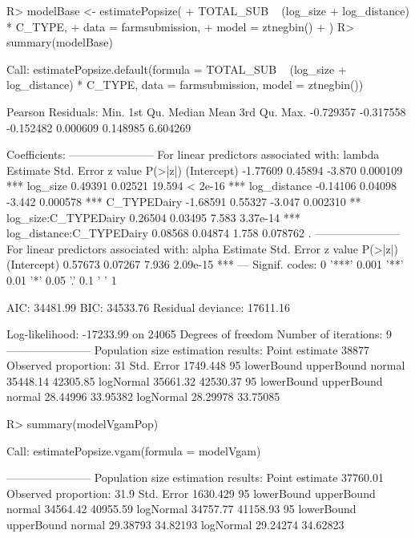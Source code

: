\documentclass[nojss]{jss}
\newcommand{\1}{\mathcal{I}} \newcommand{\bZero}{\boldsymbol{0}}
\begin{document}
\begin{CodeChunk}
\begin{CodeInput}
R> modelBase <- estimatePopsize(
+   TOTAL_SUB ~ (log_size + log_distance) * C_TYPE,
+   data = farmsubmission,
+   model = ztnegbin()
+ )
R> summary(modelBase)
\end{CodeInput}
\begin{CodeOutput}

Call:
estimatePopsize.default(formula = TOTAL_SUB ~ (log_size + log_distance) *
    C_TYPE, data = farmsubmission, model = ztnegbin())

Pearson Residuals:
     Min.   1st Qu.    Median      Mean   3rd Qu.      Max.
-0.729357 -0.317558 -0.152482  0.000609  0.148985  6.604269

Coefficients:
-----------------------
For linear predictors associated with: lambda
                         Estimate Std. Error z value  P(>|z|)
(Intercept)              -1.77609    0.45894  -3.870 0.000109 ***
log_size                  0.49391    0.02521  19.594  < 2e-16 ***
log_distance             -0.14106    0.04098  -3.442 0.000578 ***
C_TYPEDairy              -1.68591    0.55327  -3.047 0.002310 **
log_size:C_TYPEDairy      0.26504    0.03495   7.583 3.37e-14 ***
log_distance:C_TYPEDairy  0.08568    0.04874   1.758 0.078762 .
-----------------------
For linear predictors associated with: alpha
            Estimate Std. Error z value  P(>|z|)
(Intercept)  0.57673    0.07267   7.936 2.09e-15 ***
---
Signif. codes:  0 '***' 0.001 '**' 0.01 '*' 0.05 '.' 0.1 ' ' 1

AIC: 34481.99
BIC: 34533.76
Residual deviance: 17611.16

Log-likelihood: -17233.99 on 24065 Degrees of freedom
Number of iterations: 9
-----------------------
Population size estimation results:
Point estimate 38877
Observed proportion: 31%
Std. Error 1749.448
95%
          lowerBound upperBound
normal      35448.14   42305.85
logNormal   35661.32   42530.37
95%
          lowerBound upperBound
normal      28.44996   33.95382
logNormal   28.29978   33.75085
\end{CodeOutput}
\begin{CodeInput}
R> summary(modelVgamPop)
\end{CodeInput}
\begin{CodeOutput}

Call:
estimatePopsize.vgam(formula = modelVgam)

-----------------------
Population size estimation results:
Point estimate 37760.01
Observed proportion: 31.9%
Std. Error 1630.429
95%
          lowerBound upperBound
normal      34564.42   40955.59
logNormal   34757.77   41158.93
95%
          lowerBound upperBound
normal      29.38793   34.82193
logNormal   29.24274   34.62823


\end{CodeOutput}
\end{CodeChunk}
\end{document}
